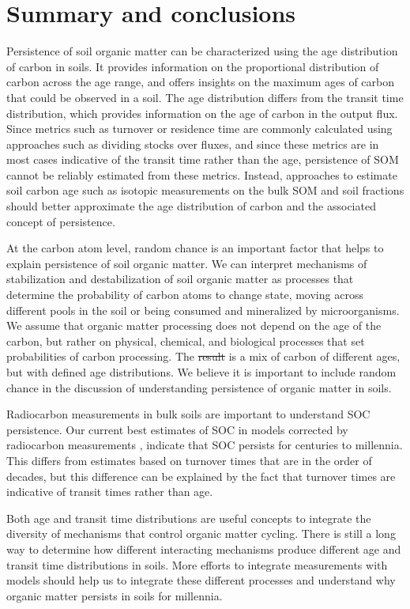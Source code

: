 \documentclass[draft,linenumbers]{agujournal}
\providecommand{\DIFadd}[1]{{\protect\color{blue}\uwave{#1}}} %
\providecommand{\DIFdel}[1]{{\protect\color{red}\sout{#1}}}                      %
\providecommand{\DIFaddbegin}{} %
\providecommand{\DIFaddend}{} %
\providecommand{\DIFdelbegin}{} %
\providecommand{\DIFdelend}{} %
\begin{document}
\DIFaddend \section{Summary and conclusions}
Persistence of soil organic matter can be characterized using the age distribution of carbon in soils. It provides information on the proportional distribution of carbon across the age range, and offers insights on the maximum ages of carbon that could be observed in a soil. The age distribution differs from the transit time distribution, which provides information on the age of carbon in the output flux. Since metrics such as turnover or residence time are commonly calculated using approaches such as dividing stocks over fluxes, and since these metrics are in most cases indicative of the transit time rather than the age, persistence of SOM cannot be reliably estimated from these metrics. Instead, approaches to estimate soil carbon age such as isotopic measurements on the bulk SOM and soil fractions should better approximate the age distribution of carbon and the associated concept of persistence. 

At the carbon atom level, random chance is an important factor that helps to explain persistence of soil organic matter. We can interpret mechanisms of stabilization and destabilization of soil organic matter as processes that determine the probability of carbon atoms to change state, moving across different pools in the soil or being consumed and mineralized by microorganisms. We assume that organic matter processing does not depend on the age of the carbon, but rather on physical, chemical, and biological processes that set probabilities of carbon processing. The \DIFdelbegin \DIFdel{result }\DIFdelend \DIFaddbegin \DIFadd{emergent outcome }\DIFaddend is a mix of carbon of different ages, but with defined age distributions. We believe it is important to include random chance in the discussion of understanding persistence of organic matter in soils. 

Radiocarbon measurements in bulk soils are important to understand SOC persistence. Our current best estimates of SOC in models corrected by radiocarbon measurements \citep{He2016}, indicate that SOC persists for centuries to millennia. This differs from estimates based on turnover times that are in the order of decades, but this difference can be explained by the fact that turnover times are indicative of transit times rather than age. 

Both age and transit time distributions are useful concepts to integrate the diversity of mechanisms that control organic matter cycling. There is still a long way to determine how different interacting mechanisms produce different age and transit time distributions in soils. More efforts to integrate measurements with models should help us to integrate these different processes and understand why organic matter persists in soils for millennia. 
\end{document}
